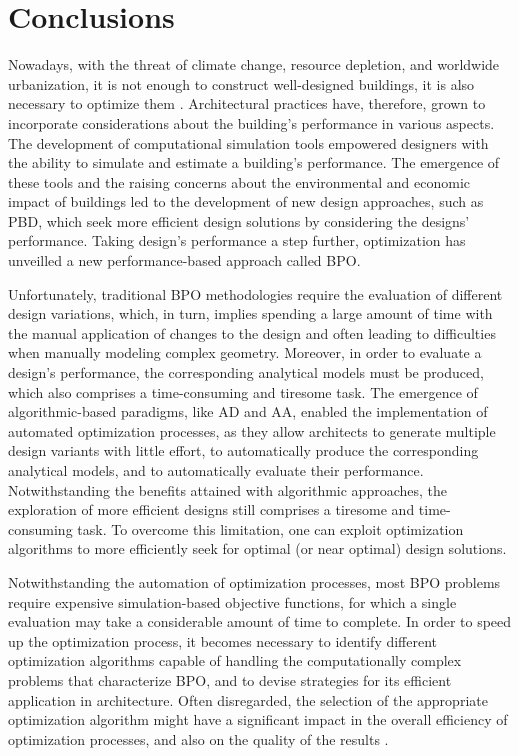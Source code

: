 \section{Conclusions}
\label{sec:concl}

Nowadays, with the threat of climate change, resource depletion, and worldwide urbanization, it is not enough to construct well-designed buildings, it is also necessary to optimize them \cite{Wortmann2015AdvSBO}. Architectural practices have, therefore, grown to incorporate considerations about the building's performance in various aspects. The development of computational simulation tools empowered designers with the ability to simulate and estimate a building’s performance. The emergence of these tools and the raising concerns about the environmental and economic impact of buildings led to the development of new design approaches, such as \ac{PBD}, which seek more efficient design solutions by considering the designs’ performance. Taking design’s performance a step further, optimization has unveilled a new performance-based approach called \ac{BPO}. 

Unfortunately, traditional \ac{BPO} methodologies require the evaluation of different design variations, which, in turn, implies spending a large amount of time with the manual application of changes to the design and often leading to difficulties when manually modeling complex geometry. Moreover, in order to evaluate a design's performance, the corresponding analytical models must be produced, which also comprises a time-consuming and tiresome task. The emergence of algorithmic-based paradigms, like \ac{AD} and \ac{AA}, enabled the implementation of automated optimization processes, as they allow architects to generate multiple design variants with little effort, to automatically produce the corresponding analytical models, and to automatically evaluate their performance. Notwithstanding the benefits attained with algorithmic approaches, the exploration of more efficient designs still comprises a tiresome and time-consuming task. To overcome this limitation, one can exploit optimization algorithms to more efficiently seek for optimal (or near optimal) design solutions.

Notwithstanding the automation of optimization processes, most \ac{BPO} problems require expensive simulation-based objective functions, for which a single evaluation may take a considerable amount of time to complete. In order to speed up the optimization process, it becomes necessary to identify different optimization algorithms capable of handling the computationally complex problems that characterize \ac{BPO}, and to devise strategies for its efficient application in architecture. Often disregarded, the selection of the appropriate optimization algorithm might have a significant impact in the overall efficiency of optimization processes, and also on the quality of the results \cite{Wolpert1997NFLT}.

